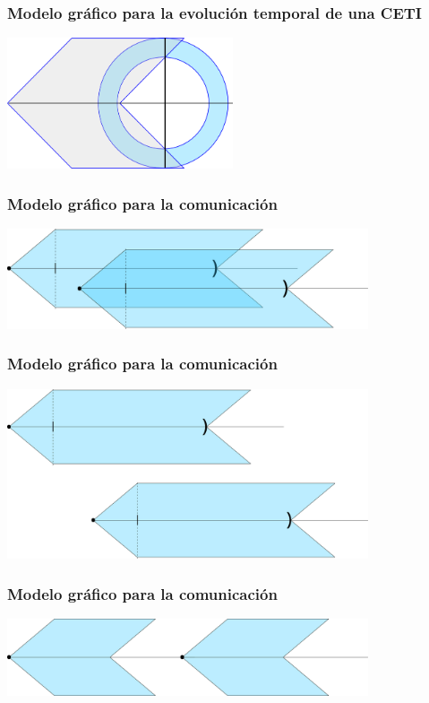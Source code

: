 \documentclass[handout]{beamer}
\theoremstyle{plain}
\theoremstyle{definition}
\theoremstyle{remark}
\begin{document}
\begin{frame}\frametitle{Modelo gráfico para la evolución temporal de
   una CETI}
\centering
\includegraphics[width=0.5\textwidth]{g5120.png}
\end{frame}%

\begin{frame}\frametitle{Modelo gráfico para la comunicación}
\centering
\includegraphics[width=0.8\textwidth]{g5331.png}
\end{frame}%

\begin{frame}\frametitle{Modelo gráfico para la comunicación}
\centering
\includegraphics[width=0.8\textwidth]{g5459.png}
\end{frame}%

\begin{frame}\frametitle{Modelo gráfico para la comunicación}
\centering
\includegraphics[width=0.8\textwidth]{g5539.png}
\end{frame}%
\end{document}
